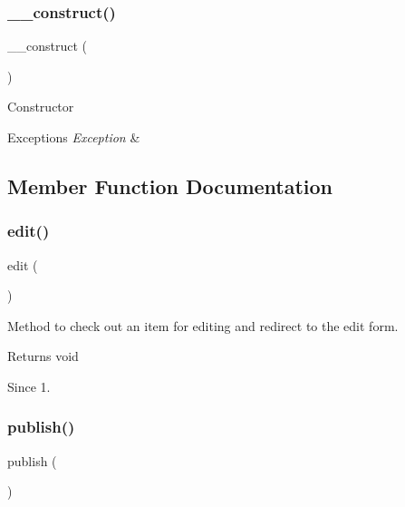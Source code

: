\subsubsection{\+\_\+\+\_\+construct()}
{\footnotesize\ttfamily \+\_\+\+\_\+construct (\begin{DoxyParamCaption}{ }\end{DoxyParamCaption})}

Constructor


\begin{DoxyExceptions}{Exceptions}
{\em Exception} & \\
\hline
\end{DoxyExceptions}


\subsection{Member Function Documentation}
\mbox{\label{classtks__agenda_controller_newsitem_a5cb75cbb16467eb1768837d126dc535b}} 
\subsubsection{edit()}
{\footnotesize\ttfamily edit (\begin{DoxyParamCaption}{ }\end{DoxyParamCaption})}

Method to check out an item for editing and redirect to the edit form.

\begin{DoxyReturn}{Returns}
void
\end{DoxyReturn}
\begin{DoxySince}{Since}
1. 
\end{DoxySince}
\mbox{\label{classtks__agenda_controller_newsitem_ad3ff33669cf7b4055383b87d2ed32aa2}} 
\subsubsection{publish()}
{\footnotesize\ttfamily publish (\begin{DoxyParamCaption}{ }\end{DoxyParamCaption})}

